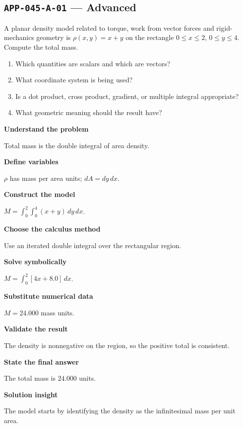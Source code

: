 \documentclass[11pt]{book}
\newcommand{\pid}[1]{\texttt{#1}}
\begin{document}
\subsection*{\pid{APP-045-A-01} — Advanced}
\begin{problembox}
A planar density model related to torque, work from vector forces and rigid-mechanics geometry is $\rho(x,y)=x+y$ on the rectangle $0\le x\le 2$, $0\le y\le 4$. Compute the total mass.
\end{problembox}
\begin{promptbox}\begin{enumerate}
\item Which quantities are scalars and which are vectors?
\item What coordinate system is being used?
\item Is a dot product, cross product, gradient, or multiple integral appropriate?
\item What geometric meaning should the result have?
\end{enumerate}\end{promptbox}
\begin{solutionbox}
\textbf{Understand the problem}\par Total mass is the double integral of area density.\par\medskip
\textbf{Define variables}\par $\rho$ has mass per area units; $dA=dy\,dx$.\par\medskip
\textbf{Construct the model}\par $M=\int_0^{2}\int_0^{4}(x+y)\,dy\,dx$.\par\medskip
\textbf{Choose the calculus method}\par Use an iterated double integral over the rectangular region.\par\medskip
\textbf{Solve symbolically}\par $M=\int_0^{2}[4x+8.0]\,dx$.\par\medskip
\textbf{Substitute numerical data}\par $M=24.000$ mass units.\par\medskip
\textbf{Validate the result}\par The density is nonnegative on the region, so the positive total is consistent.\par\medskip
\textbf{State the final answer}\par The total mass is $24.000$ units.\par\medskip
\textbf{Solution insight}\par The model starts by identifying the density as the infinitesimal mass per unit area.\par\medskip
\end{solutionbox}
\end{document}
